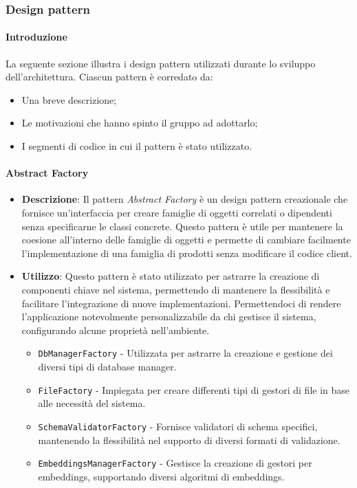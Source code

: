 \subsubsection{Design pattern}
\paragraph{Introduzione}
\par La seguente sezione illustra i design pattern utilizzati durante lo sviluppo dell'architettura. Ciascun pattern è corredato da:
\begin{itemize}
    \item Una breve descrizione;
    \item Le motivazioni che hanno spinto il gruppo ad adottarlo;
    \item I segmenti di codice in cui il pattern è stato utilizzato.
\end{itemize}

\paragraph{Abstract Factory}
\begin{itemize}
    \item \textbf{Descrizione}: Il pattern \textit{Abstract Factory} è un design pattern creazionale che fornisce un'interfaccia per creare famiglie di oggetti correlati o dipendenti senza specificarne le classi concrete. Questo pattern è utile per mantenere la coesione all'interno delle famiglie di oggetti e permette di cambiare facilmente l'implementazione di una famiglia di prodotti senza modificare il codice client.
    \item \textbf{Utilizzo}: Questo pattern è stato utilizzato per astrarre la creazione di componenti chiave nel sistema, permettendo di mantenere la flessibilità e facilitare l'integrazione di nuove implementazioni. Permettendoci di rendere l'applicazione notevolmente personalizzabile da chi gestisce il sistema, configurando alcune proprietà nell'ambiente.
    \begin{itemize}
        \item \texttt{DbManagerFactory} - Utilizzata per astrarre la creazione e gestione dei diversi tipi di database manager.
        \item \texttt{FileFactory} - Impiegata per creare differenti tipi di gestori di file in base alle necessità del sistema.
        \item \texttt{SchemaValidatorFactory} - Fornisce validatori di schema specifici, mantenendo la flessibilità nel supporto di diversi formati di validazione.
        \item \texttt{EmbeddingsManagerFactory} - Gestisce la creazione di gestori per embeddings, supportando diversi algoritmi di embeddings.
    \end{itemize}
\end{itemize}

